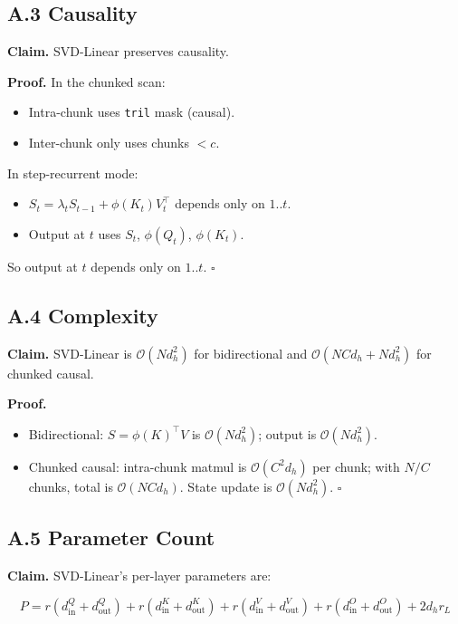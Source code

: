 \subsection{A.3 Causality}

\textbf{Claim.} SVD-Linear preserves causality.

\textbf{Proof.} In the chunked scan:
\begin{itemize}
\item Intra-chunk uses \texttt{tril} mask (causal).
\item Inter-chunk only uses chunks $< c$.

\end{itemize}
In step-recurrent mode:
\begin{itemize}
\item $S_t = \lambda_t S_{t-1} + \phi(K_t) V_t^\top$ depends only on $1..t$.
\item Output at $t$ uses $S_t$, $\phi(Q_t)$, $\phi(K_t)$.

\end{itemize}
So output at $t$ depends only on $1..t$. $\square$

\subsection{A.4 Complexity}

\textbf{Claim.} SVD-Linear is $\mathcal{O}(N d_h^2)$ for bidirectional and 
$\mathcal{O}(N C d_h + N d_h^2)$ for chunked causal.

\textbf{Proof.} 
\begin{itemize}
\item Bidirectional: $S = \phi(K)^\top V$ is $\mathcal{O}(N d_h^2)$; output
  is $\mathcal{O}(N d_h^2)$.
\item Chunked causal: intra-chunk matmul is $\mathcal{O}(C^2 d_h)$ per chunk;
  with $N/C$ chunks, total is $\mathcal{O}(N C d_h)$. State update is
  $\mathcal{O}(N d_h^2)$. $\square$

\end{itemize}
\subsection{A.5 Parameter Count}

\textbf{Claim.} SVD-Linear's per-layer parameters are:

\[
P = r(d_\text{in}^Q + d_\text{out}^Q) + r(d_\text{in}^K + d_\text{out}^K) + r(d_\text{in}^V + d_\text{out}^V) + r(d_\text{in}^O + d_\text{out}^O) + 2 d_h r_L
\]

